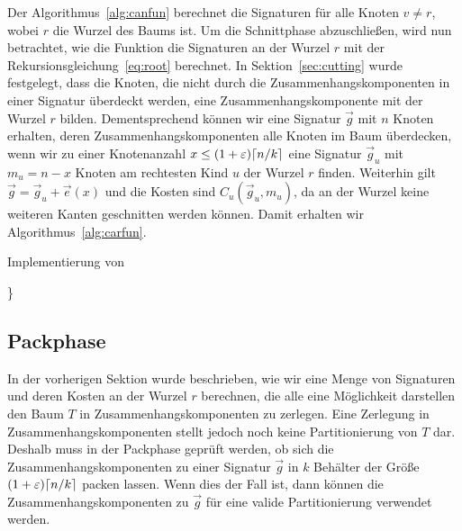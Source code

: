 Der Algorithmus~\ref{alg:canfun} berechnet die Signaturen für alle Knoten $v \neq r$, wobei $r$ die Wurzel des Baums ist.
Um die Schnittphase abzuschließen, wird nun betrachtet, wie die Funktion \carfun{} die Signaturen an der Wurzel $r$ mit der Rekursionsgleichung~\eqref{eq:root} berechnet.
In Sektion~\ref{sec:cutting} wurde festgelegt, dass die Knoten, die nicht durch die Zusammenhangskomponenten in einer Signatur überdeckt werden, eine Zusammenhangskomponente mit der Wurzel $r$ bilden.
Dementsprechend können wir eine Signatur $\vec{g}$ mit $n$ Knoten erhalten, deren Zusammenhangskomponenten alle Knoten im Baum überdecken, wenn wir zu einer Knotenanzahl $x \leq (1+\varepsilon)\lceil n/k\rceil$ eine Signatur $\vec{g}_u$ mit $m_u = n - x$ Knoten am rechtesten Kind $u$ der Wurzel $r$ finden.
Weiterhin gilt $\vec{g} = \vec{g}_u + \vec{e}(x)$ und die Kosten sind $C_u(\vec{g}_u, m_u)$, da an der Wurzel keine weiteren Kanten geschnitten werden können.
Damit erhalten wir Algorithmus~\ref{alg:carfun}.

\begin{algorithm}
    \caption{Implementierung von \carfun{}}\label{alg:carfun}
    \begin{algorithmic}
                    \}
                \EndFor
           \EndFor
        \EndFunction
    \end{algorithmic}
\end{algorithm}


\subsection{Packphase}
In der vorherigen Sektion wurde beschrieben, wie wir eine Menge von Signaturen und deren Kosten an der Wurzel $r$ berechnen, die alle eine Möglichkeit darstellen den Baum $T$ in Zusammenhangskomponenten zu zerlegen.
Eine Zerlegung in Zusammenhangskomponenten stellt jedoch noch keine Partitionierung von $T$ dar.
Deshalb muss in der Packphase geprüft werden, ob sich die Zusammenhangskomponenten zu einer Signatur $\vec{g}$ in $k$ Behälter der Größe $(1+\varepsilon)\lceil n/k\rceil$ packen lassen.
Wenn dies der Fall ist, dann können die Zusammenhangskomponenten zu $\vec{g}$ für eine valide Partitionierung verwendet werden.

